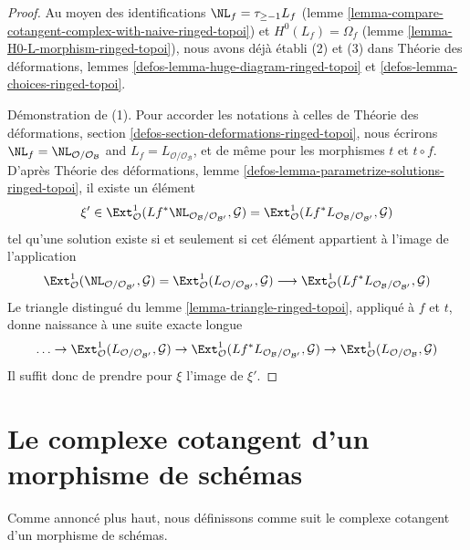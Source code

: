 \begin{proof}
Au moyen des identifications $\NL_f = \tau_{\geq -1}L_f$ (lemme
\ref{lemma-compare-cotangent-complex-with-naive-ringed-topoi}) et
$H^0(L_f) = \Omega_f$
(lemme \ref{lemma-H0-L-morphism-ringed-topoi}), nous avons déjà établi (2) et
(3) dans Théorie des déformations, lemmes
\ref{defos-lemma-huge-diagram-ringed-topoi} et
\ref{defos-lemma-choices-ringed-topoi}.

\medskip\noindent
Démonstration de (1). Pour accorder les notations à celles de Théorie des
déformations, section \ref{defos-section-deformations-ringed-topoi}, nous
écrirons
$\NL_f = \NL_{\mathcal{O}/\mathcal{O}_\mathcal{B}}$ and
$L_f = L_{\mathcal{O}/\mathcal{O}_\mathcal{B}}$, et de même pour les morphismes
$t$ et $t \circ f$. D'après Théorie des déformations, lemme
\ref{defos-lemma-parametrize-solutions-ringed-topoi}, il existe un élément
$$
\xi' \in
\Ext^1_\mathcal{O}(
Lf^*\NL_{\mathcal{O}_\mathcal{B}/\mathcal{O}_{\mathcal{B}'}}, \mathcal{G}) =
\Ext^1_\mathcal{O}(
Lf^*L_{\mathcal{O}_\mathcal{B}/\mathcal{O}_{\mathcal{B}'}}, \mathcal{G})
$$
tel qu'une solution existe si et seulement si cet élément appartient à l'image
de l'application
$$
\Ext^1_\mathcal{O}(
\NL_{\mathcal{O}/\mathcal{O}_{\mathcal{B}'}}, \mathcal{G}) =
\Ext^1_\mathcal{O}(
L_{\mathcal{O}/\mathcal{O}_{\mathcal{B}'}}, \mathcal{G})
\longrightarrow
\Ext^1_\mathcal{O}(
Lf^*L_{\mathcal{O}_\mathcal{B}/\mathcal{O}_{\mathcal{B}'}}, \mathcal{G})
$$
Le triangle distingué du lemme \ref{lemma-triangle-ringed-topoi}, appliqué à
$f$ et $t$, donne naissance à une suite exacte longue
$$
\ldots \to
\Ext^1_\mathcal{O}(
L_{\mathcal{O}/\mathcal{O}_{\mathcal{B}'}}, \mathcal{G}) \to
\Ext^1_\mathcal{O}(
Lf^*L_{\mathcal{O}_\mathcal{B}/\mathcal{O}_{\mathcal{B}'}}, \mathcal{G})
\to
\Ext^1_\mathcal{O}(
L_{\mathcal{O}/\mathcal{O}_\mathcal{B}}, \mathcal{G})
$$
Il suffit donc de prendre pour $\xi$ l'image de $\xi'$.
\end{proof}












\section{Le complexe cotangent d'un morphisme de schémas}
\label{section-cotangent-morphism-schemes}

\noindent
Comme annoncé plus haut, nous définissons comme suit le complexe cotangent d'un
morphisme de schémas.

